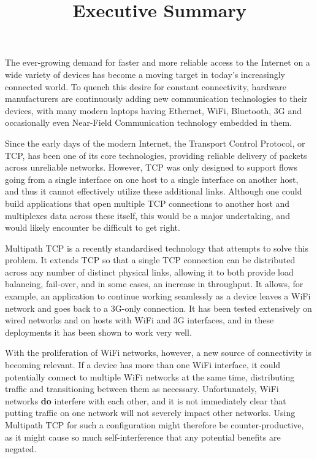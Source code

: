 \documentclass[12pt,a4paper]{article}
\title{\vspace{-5ex}Executive Summary}
\author{\vspace{-5ex}}
\date{\vspace{-5ex}}
\begin{document}
\maketitle
\onehalfspacing
The ever-growing demand for faster and more reliable access to the Internet on a
wide variety of devices has become a moving target in today's increasingly
connected world. To quench this desire for constant connectivity, hardware
manufacturers are continuously adding new communication technologies to their
devices, with many modern laptops having Ethernet, WiFi, Bluetooth, 3G and
occasionally even Near-Field Communication technology embedded in them.

Since the early days of the modern Internet, the Transport Control Protocol, or
TCP, has been one of its core technologies, providing reliable delivery of
packets across unreliable networks. However, TCP was only designed to support
flows going from a single interface on one host to a single interface on another
host, and thus it cannot effectively utilize these additional links. Although
one could build applications that open multiple TCP connections to another host
and multiplexes data across these itself, this would be a major undertaking, and
would likely encounter be difficult to get right.

Multipath TCP is a recently standardised technology that attempts to solve this
problem. It extends TCP so that a single TCP connection can be distributed
across any number of distinct physical links, allowing it to both provide load
balancing, fail-over, and in some cases, an increase in throughput. It allows,
for example, an application to continue working seamlessly as a device leaves a
WiFi network and goes back to a 3G-only connection. It has been tested
extensively on wired networks and on hosts with WiFi and 3G interfaces, and in
these deployments it has been shown to work very well.

With the proliferation of WiFi networks, however, a new source of connectivity
is becoming relevant. If a device has more than one WiFi interface, it could
potentially connect to multiple WiFi networks at the same time, distributing
traffic and transitioning between them as necessary. Unfortunately, WiFi
networks \textbf{do} interfere with each other, and it is not immediately clear
that putting traffic on one network will not severely impact other networks.
Using Multipath TCP for such a configuration might therefore be
counter-productive, as it might cause so much self-interference that any
potential benefits are negated.
\end{document}
